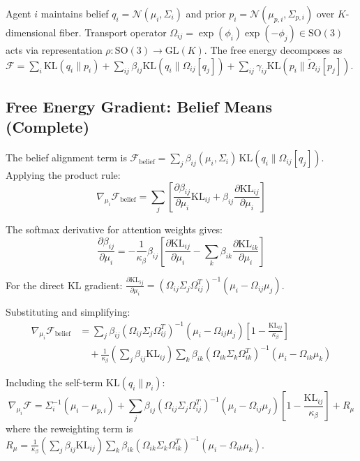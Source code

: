 \documentclass[11pt]{article}
\begin{document}
Agent $i$ maintains belief $q_i = \mathcal{N}(\mu_i, \Sigma_i)$ and prior $p_i = \mathcal{N}(\mu_{p,i}, \Sigma_{p,i})$ over $K$-dimensional fiber. Transport operator $\Omega_{ij} = \exp(\phi_i)\exp(-\phi_j) \in \mathrm{SO}(3)$ acts via representation $\rho: \mathrm{SO}(3) \to \mathrm{GL}(K)$. The free energy decomposes as $\mathcal{F} = \sum_i \mathrm{KL}(q_i \| p_i) + \sum_{ij} \beta_{ij} \mathrm{KL}(q_i \| \Omega_{ij}[q_j]) + \sum_{ij} \gamma_{ij} \mathrm{KL}(p_i \| \tilde{\Omega}_{ij}[p_j])$.

\subsection*{Free Energy Gradient: Belief Means (Complete)}

The belief alignment term is $\mathcal{F}_{\mathrm{belief}} = \sum_j \beta_{ij}(\mu_i, \Sigma_i) \, \mathrm{KL}(q_i \| \Omega_{ij}[q_j])$. Applying the product rule:
\begin{equation}
\nabla_{\mu_i} \mathcal{F}_{\mathrm{belief}} = \sum_j \left[ \frac{\partial \beta_{ij}}{\partial \mu_i} \mathrm{KL}_{ij} + \beta_{ij} \frac{\partial \mathrm{KL}_{ij}}{\partial \mu_i} \right]
\end{equation}

The softmax derivative for attention weights gives:
\begin{equation}
\frac{\partial \beta_{ij}}{\partial \mu_i} = -\frac{1}{\kappa_\beta} \beta_{ij} \left[\frac{\partial \mathrm{KL}_{ij}}{\partial \mu_i} - \sum_k \beta_{ik} \frac{\partial \mathrm{KL}_{ik}}{\partial \mu_i}\right]
\end{equation}

For the direct KL gradient: $\frac{\partial \mathrm{KL}_{ij}}{\partial \mu_i} = (\Omega_{ij}\Sigma_j\Omega_{ij}^T)^{-1}(\mu_i - \Omega_{ij}\mu_j)$.

Substituting and simplifying:
\begin{align}
\nabla_{\mu_i} \mathcal{F}_{\mathrm{belief}} &= \sum_j \beta_{ij} (\Omega_{ij}\Sigma_j\Omega_{ij}^T)^{-1}(\mu_i - \Omega_{ij}\mu_j) \left[1 - \frac{\mathrm{KL}_{ij}}{\kappa_\beta}\right] \nonumber \\
&\quad + \frac{1}{\kappa_\beta}\left(\sum_j \beta_{ij}\mathrm{KL}_{ij}\right) \sum_k \beta_{ik} (\Omega_{ik}\Sigma_k\Omega_{ik}^T)^{-1}(\mu_i - \Omega_{ik}\mu_k)
\end{align}

Including the self-term $\mathrm{KL}(q_i \| p_i)$:
\begin{equation}
\boxed{\nabla_{\mu_i} \mathcal{F} = \Sigma_i^{-1}(\mu_i - \mu_{p,i}) + \sum_j \beta_{ij} (\Omega_{ij}\Sigma_j\Omega_{ij}^T)^{-1}(\mu_i - \Omega_{ij}\mu_j) \left[1 - \frac{\mathrm{KL}_{ij}}{\kappa_\beta}\right] + R_\mu}
\end{equation}
where the reweighting term is $R_\mu = \frac{1}{\kappa_\beta}(\sum_j \beta_{ij}\mathrm{KL}_{ij}) \sum_k \beta_{ik} (\Omega_{ik}\Sigma_k\Omega_{ik}^T)^{-1}(\mu_i - \Omega_{ik}\mu_k)$.
\end{document}
